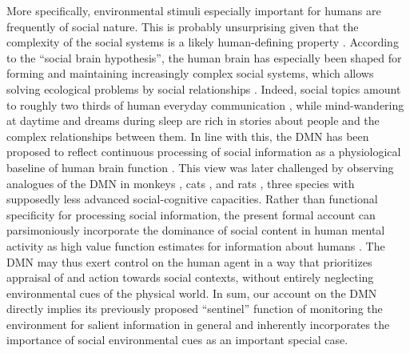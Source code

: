 \documentclass[10pt,letterpaper]{article}
\begin{document}
More specifically,
environmental stimuli especially important for humans are frequently of
social nature. This is probably unsurprising
given that
the complexity of the social systems
is a likely human-defining property
\citep{tomasello2009cultural}.
According to the ``social brain hypothesis'',
the human brain has especially been shaped for
forming and maintaining increasingly complex
social systems,
which allows solving ecological problems by social relationships
\citep{whiten1988machiavellian}.
Indeed, social topics amount to roughly
two thirds of human everyday communication \citep{dunbar1997human},
while
mind-wandering at daytime and dreams during sleep
are rich in stories about people and
the complex relationships between them.
%
In line with this, the DMN has been proposed to reflect
continuous processing of social information as a
physiological baseline of human brain function
\citep{schilbach2008minds}. This view was later challenged by observing
analogues of the DMN in monkeys \citep{mantini2011default},
cats \citep{popa2009contrasting},
and rats \citep{lu2012rat}, three species with
supposedly less advanced social-cognitive capacities.
Rather than functional specificity for processing social information,
the present formal account can parsimoniously incorporate
the dominance of social content in
human mental activity
as high value function estimates for information about humans
\citep{baker2009action, kampe2001psychology, krienen2010clan}.
The DMN may thus exert control on the human agent in a way that prioritizes
appraisal of and action towards social contexts,
without entirely neglecting environmental cues of the physical world.
In sum,
our account on the DMN directly implies
its previously proposed ``sentinel'' function
of monitoring the environment for salient information
in general and
inherently incorporates the importance of social environmental cues
as an important special case.
\end{document}
